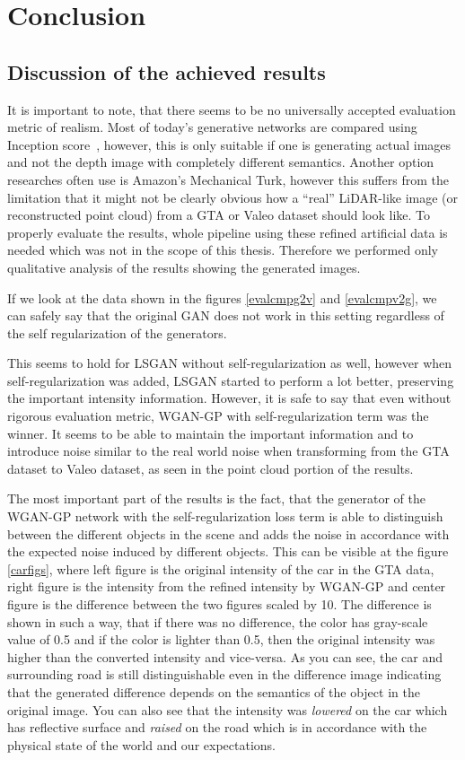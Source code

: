 \chapter{Conclusion}

\section{Discussion of the achieved results}

It is important to note, that there seems to be no universally accepted evaluation metric of realism. Most of today's generative networks are compared using Inception score~\cite{inception}, however, this is only suitable if one is generating actual images and not the depth image with completely different semantics. Another option researches often use is Amazon's Mechanical Turk, however this suffers from the limitation that it might not be clearly obvious how a ``real'' LiDAR-like image (or reconstructed point cloud) from a GTA or Valeo dataset should look like. To properly evaluate the results, whole pipeline using these refined artificial data is needed which was not in the scope of this thesis. Therefore we performed only qualitative analysis of the results showing the generated images.

If we look at the data shown in the figures \ref{evalcmpg2v} and \ref{evalcmpv2g}, we can safely say that the original GAN does not work in this setting regardless of the self regularization of the generators.

This seems to hold for LSGAN without self-regularization as well, however when self-regularization was added, LSGAN started to perform a lot better, preserving the important intensity information. However, it is safe to say that even without rigorous evaluation metric, WGAN-GP with self-regularization term was the winner. It seems to be able to maintain the important information and to introduce noise similar to the real world noise when transforming from the GTA dataset to Valeo dataset, as seen in the point cloud portion of the results.

The most important part of the results is the fact, that the generator of the WGAN-GP network with the self-regularization loss term is able to distinguish between the different objects in the scene and adds the noise in accordance with the expected noise induced by different objects. This can be visible at the figure \ref{carfigs}, where left figure is the original intensity of the car in the GTA data, right figure is the intensity from the refined intensity by WGAN-GP and center figure is the difference between the two figures scaled by 10. The difference is shown in such a way, that if there was no difference, the color has gray-scale value of 0.5 and if the color is lighter than 0.5, then the original intensity was higher than the converted intensity and vice-versa. As you can see, the car and surrounding road is still distinguishable even in the difference image indicating that the generated difference depends on the semantics of the object in the original image. You can also see that the intensity was {\em lowered} on the car which has reflective surface and {\em raised} on the road which is in accordance with the physical state of the world and our expectations.

